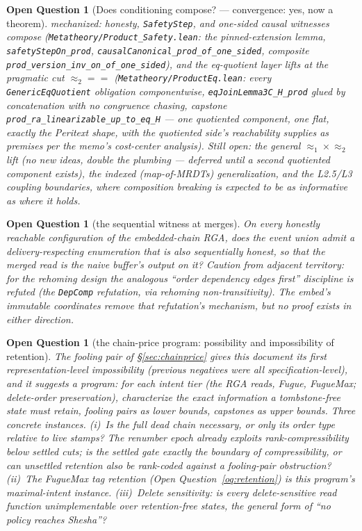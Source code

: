 \documentclass[11pt]{article}
\newtheorem{openq}[theorem]{Open Question}
\newcommand{\lean}[1]{\texttt{#1}}
\newcommand{\eqobs}{\approx}
\newcommand{\code}[1]{\texttt{#1}}
\begin{document}
\begin{openq}[Does conditioning compose? --- convergence: yes, now a theorem]
mechanized: honesty, \lean{SafetyStep}, and \emph{one-sided} causal
witnesses compose (\lean{Metatheory/Product\_Safety.lean}: the
pinned-extension lemma, \lean{safetyStepOn\_prod},
\lean{causalCanonical\_prod\_of\_one\_sided}, composite
\lean{prod\_version\_inv\_on\_of\_one\_sided}), and the eq-quotient layer
lifts at the pragmatic cut $\eqobs_2 = {=}$
(\lean{Metatheory/ProductEq.lean}: every \lean{GenericEqQuotient}
obligation componentwise, \lean{eqJoinLemma3C\_H\_prod} glued by
concatenation with no congruence chasing, capstone
\lean{prod\_ra\_linearizable\_up\_to\_eq\_H} --- one quotiented component,
one flat, exactly the Peritext shape, with the quotiented side's
reachability supplies as premises per the memo's cost-center analysis).
Still open: the general $\eqobs_1 \times \eqobs_2$ lift (no new ideas,
double the plumbing --- deferred until a second quotiented component
exists), the indexed (map-of-MRDTs) generalization, and the L2.5/L3
coupling boundaries, where composition \emph{breaking} is expected to be
as informative as where it holds.
\end{openq}

\begin{openq}[the sequential witness at merges]
\label{oq:seqwitness}
On every honestly reachable configuration of the embedded-chain RGA,
does the event union admit a delivery-respecting enumeration that is
also sequentially honest, so that the merged read is the naive
buffer's output on it? Caution from adjacent territory: for the
rehoming design the analogous ``order dependency edges first''
discipline is refuted (the \code{DepComp} refutation, via rehoming
non-transitivity). The embed's immutable coordinates remove that
refutation's mechanism, but no proof exists in either direction.
\end{openq}

\begin{openq}[the chain-price program: possibility and impossibility of
retention]
\label{oq:chainprice}
The fooling pair of \S\ref{sec:chainprice} gives this document its
first \emph{representation}-level impossibility (previous negatives
were all specification-level), and it suggests a program: for each
intent tier (the RGA reads, Fugue, FugueMax; delete-order
preservation), characterize the exact information a tombstone-free
state must retain, fooling pairs as lower bounds, capstones as upper
bounds. Three concrete instances. (i)~Is the \emph{full} dead chain
necessary, or only its order type relative to live stamps? The
renumber epoch already exploits rank-compressibility below settled
cuts; is the settled gate exactly the boundary of compressibility, or
can unsettled retention also be rank-coded against a fooling-pair
obstruction? (ii)~The FugueMax tag retention
(Open Question~\ref{oq:retention}) is this program's maximal-intent
instance. (iii)~Delete sensitivity: is every delete-sensitive read
function unimplementable over retention-free states, the general form
of ``no policy reaches Shesha''?
\end{openq}
\end{document}
